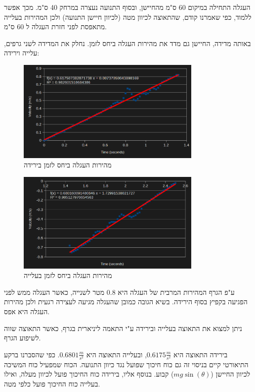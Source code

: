 \documentclass[14pt]{extarticle}
\begin{document}
העגלה התחילה במיקום 60 ס"מ מהחיישן, ובסוף התנועה נעצרה במרחק 40 ס"מ.
מכך אפשר ללמוד, כפי שאמרנו קודם, שהתאוצה לכיוון מטה (לכיוון חיישן התנועה) ולכן המהירות בעלייה מתאפסת לפני חזרת העגלה ל 60 ס"מ.

באותה מדידה, החיישן גם מדד את מהירות העגלה ביחס לזמן. נחלק את המדידה לשני גרפים, עלייה וירידה:

\begin{figure}[H]
    \centering
    \includegraphics[width=0.8\textwidth]{maman_13_experiment_2_4_deg_no_weight_velocity_to_time_downhill.png}
    \caption{מהירות העגלה ביחס לזמן בירידה}
\end{figure}

\begin{figure}[H]
    \centering
    \includegraphics[width=0.8\textwidth]{maman_13_experiment_2_4_deg_no_weight_velocity_to_time_uphill.png}
    \caption{מהירות העגלה ביחס לזמן בעלייה}
\end{figure}

ע"פ הגרף המהירות המרבית של העגלה היא 0.8 מטר לשנייה, כאשר העגלה ממש לפני הפגיעה בקפיץ בסוף הירידה.
בשיא הגובה כמובן שהעגלה מגיעה לעצירה רגעית ולכן מהירות העגלה היא אפס.

ניתן למצוא את התאוצה בעלייה ובירידה ע"י התאמה ליניארית בגרף, כאשר התאוצה שווה לשיפוע הגרף.

בירידה התאוצה היא $0.6175 \frac{m}{s^2}$, ובעלייה התאוצה היא $0.6801 \frac{m}{s^2}$. כפי שהסברנו ברקע התיאורטי קיים בניסוי זה גם כוח חיכוך שפועל נגד כיוון התנועה.
הכוח שמפעיל כוח המשיכה לכיוון החיישן ($mg \sin(\theta)$) קבוע.
 בנוסף אליו, בירידה כוח החיכוך פועל לכיוון מעלה, ואילו בעלייה  כוח החיכוך פועל כלפי מטה.
\end{document}
